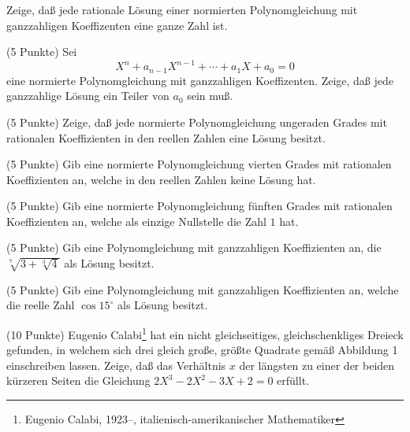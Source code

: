 \documentclass{algsheet}
\begin{document}
\begin{exercise}
    Zeige, daß jede rationale Lösung
    einer normierten Polynomgleichung mit ganzzahligen
    Koeffizenten eine ganze Zahl ist.

\end{exercise}




\begin{exercise}(5 Punkte)\newline
    Sei
    \[
        X^n + a_{n - 1} X^{n - 1} + \dotsb + a_1 X + a_0 = 0
    \]
    eine normierte Polynomgleichung mit ganzzahligen Koeffizenten. Zeige, daß
    jede ganzzahlige Lösung ein Teiler von \(a_0\) sein muß.
\end{exercise}




\begin{exercise}(5 Punkte)\newline
    Zeige, daß jede normierte Polynomgleichung ungeraden Grades mit
    rationalen Koeffizienten in den reellen Zahlen eine
    Lösung besitzt.
\end{exercise}



\begin{exercise}(5 Punkte)\newline
    Gib eine normierte Polynomgleichung vierten Grades mit
    rationalen Koeffizienten an, welche in den reellen Zahlen keine
    Lösung hat.
\end{exercise}




\begin{exercise}(5 Punkte)\newline
    Gib eine normierte Polynomgleichung fünften Grades mit
    rationalen Koeffizienten an,
    welche als einzige Nullstelle die Zahl \(1\) hat.
\end{exercise}



\begin{exercise}(5 Punkte)\newline
 Gib eine Polynomgleichung mit ganzzahligen Koeffizienten an, die $\sqrt[7]{3+\sqrt[3] 4}$ als Lösung besitzt.
\end{exercise}




\begin{exercise}(5 Punkte)\newline
    Gib eine Polynomgleichung mit ganzzahligen Koeffizienten an,
    welche die reelle Zahl \(\cos 15^\circ\) als Lösung besitzt.
\end{exercise}




\begin{exercise}(10 Punkte)\newline
    Eugenio Calabi\footnote{Eugenio Calabi, 1923--, italienisch-amerikanischer
    Mathematiker} hat ein nicht gleichseitiges, gleichschenkliges Dreieck
    gefunden, in welchem sich drei gleich große, größte Quadrate gemäß
    Abbildung 1 einschreiben lassen. Zeige, daß das Verhältnis
    \(x\) der längsten zu einer der beiden kürzeren Seiten die Gleichung
    \(2 X^3 - 2 X^2 - 3 X + 2 = 0\) erfüllt.
\end{exercise}
\end{document}
